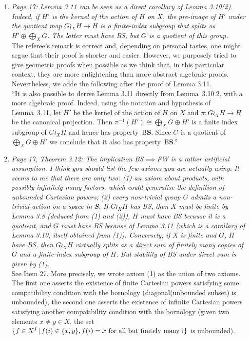 \documentclass[english,a4paper]{article}
\newcommand*{\BS}{B\textbf{S}}
\begin{document}
\begin{enumerate}
The following discussion was added after the proof of Lemma 3.9:\\
``As a direct corollary, we obtain that if property BS implies property BS’ for some S’ with non-trivial group actions and seperating infinite Cartesian powers (example: BS’=FW), then the conclusion of Lemma 3.9 holds even if S might not satisfy it’s premises. At contrario, it follows from Theorem 1.2 and Proposition B that Lemma 3.9 do not holds for property FR, property FA or having uncountable cofinality.''
%
\item\textit{Page 17: Lemma 3.11 can be seen as a direct corollary of Lemma 3.10(2). Indeed, if $H'$ is the kernel of the action of $H$ on $X$, the pre-image of $H'$ under the quotient map $G\wr_XH\to H$ is a finite-index subgroup that splits as $H'\oplus\bigoplus_XG$. The latter must have BS, but $G$ is a quotient of this group.}\\
The referee's remark is correct and, depending on personal tastes, one might argue that their proof is shorter and easier.
However, we purposely tried to give geometric proofs when possible as we think that, in this particular context, they are more enlightening than more abstract algebraic proofs.
Nevertheless, we adde the following after the proof of Lemma 3.11.\\
``It is also possible to derive Lemma 3.11 directly from Lemma~3.10.2, with a more algebraic proof.
Indeed, using the notation and hypothesis of Lemma~3.11, let $H'$ be the kernel of the action of $H$ on $X$ and $\pi\colon G\wr_XH\to H$ be the canonical projection. Then $\pi^{-1}(H')\cong \bigoplus_XG\oplus H'$ is a finite index subgroup of $G\wr_XH$ and hence has property~\BS.
Since $G$ is a quotient of $\bigoplus_XG\oplus H'$ we conclude that it also has property~\BS.''
%
\item\textit{Page 17, Theorem 3.12: The implication BS$\implies$FW is a rather artificial assumption. I think you should list the few axioms you are actually using. It seems to me that there are only two: (1) an axiom about products, with possibly infinitely many factors, which could generalise the definition of unbounded Cartesian powers; (2) every non-trivial group $G$ admits a non-trivial action on a space in \textbf{S}.
If $G\wr_XH$ has BS, then $X$ must be finite by Lemma 3.8 (deduced from (1) and (2)), $H$ must have BS because it is a quotient, and $G$ must have BS because of Lemma 3.11 (which is a corollary of Lemma 3.10, itself obtained from (1)). Conversely, if $X$ is finite and $G$, $H$ have BS, then $G\wr_XH$ virtually splits as a direct sum of finitely many copies of $G$ and a finite-index subgroup of $H$. But stability of BS under direct sum is given by (1).}\\
See Item 27. More precisely, we wrote axiom (1) as the union of two axioms. The first one asserts the existence of finite Cartesian powers satisfying some compatibility condition with the bornology (diagonal(unbounded subset) is unbounded), the second one asserts the existence of infinite Cartesian powers satisfying another compatibility condition with the bornology (given two elements $x\neq y\in X$, the set $\{f\in X^I\,|\,f(i)\in\{x,y\}, f(i)=x \textnormal{ for all but finitely many i}\}$ is unbounded).


\end{enumerate}
\end{document}

